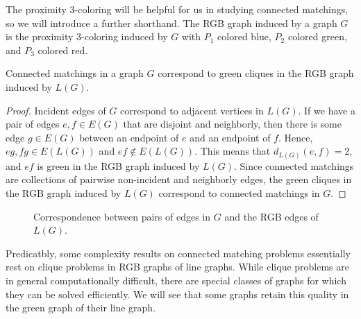 The proximity $3$-coloring will be helpful for us in studying connected matchings, so we will introduce a further shorthand.  The RGB graph induced by a graph $G$ is the proximity $3$-coloring induced by $G$ with $P_1$ colored blue, $P_2$ colored green, and $P_3$ colored red.
\begin{prop}
Connected matchings in a graph $G$ correspond to green cliques in the RGB graph induced by $L(G)$.  
\end{prop} 

\begin{proof}
	Incident edges of $G$ correspond to adjacent vertices in $L(G)$.  If we have a pair of edges $e, f \in E(G)$ that are disjoint and neighborly, then there is some edge $g \in E(G)$ between an endpoint of $e$ and an endpoint of $f$.  Hence, $eg, fg \in E(L(G))$ and $ef \notin E(L(G))$.  This means that $d_{L(G)}(e,f) = 2$, and $ef$ is green in the RGB graph induced by $L(G)$.  Since connected matchings are collections of pairwise non-incident and neighborly edges, the green cliques in   the RGB graph induced by $L(G)$ correspond to connected matchings in $G$.  
\end{proof}
\begin{figure}
\begin{center}
\hspace{1cm}
\hspace{1cm}

\label{coresp}
\caption{Correspondence between pairs of edges in $G$ and the RGB edges of $L(G)$.}
\end{center}
\end{figure}
Predicatbly, some complexity results on connected matching problems essentially rest on clique problems in RGB graphs of line graphs.  While clique problems are in general computationally difficult, there are special classes of graphs for which they can be solved efficiently.  We will see that some graphs retain this quality in the green graph of their line graph.
